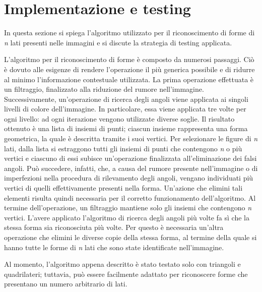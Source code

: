 	\section*{Implementazione e testing}
		In questa sezione si spiega l'algoritmo utilizzato per il riconoscimento di forme di \emph{n} lati presenti nelle immagini e si discute la strategia di testing applicata.
		
		L'algoritmo per il riconoscimento di forme è composto da numerosi passaggi.
		Ciò è dovuto alle esigenze di rendere l'operazione il più generica possibile e di ridurre al minimo l'informazione contestuale utilizzata.
		La prima operazione effettuata è un filtraggio, finalizzato alla riduzione del rumore nell'immagine.
		Successivamente, un'operazione di ricerca degli angoli viene applicata ai singoli livelli di colore dell'immagine.
		In particolare, essa viene applicata tre volte per ogni livello: ad ogni iterazione vengono utilizzate diverse soglie.
		Il risultato ottenuto è una lista di insiemi di punti; ciascun insieme rappresenta una forma geometrica, la quale è descritta tramite i suoi vertici.
		Per selezionare le figure di \emph{n} lati, dalla lista si estraggono tutti gli insiemi di punti che contengono \emph{n} o più vertici e ciascuno di essi subisce un'operazione finalizzata all'eliminazione dei falsi angoli.
		Può succedere, infatti, che, a causa del rumore presente nell'immagine o di imperfezioni nella procedura di rilevamento degli angoli, vengano individuati più vertici di quelli effettivamente presenti nella forma.
		Un'azione che elimini tali elementi risulta quindi necessaria per il corretto funzionamento dell'algoritmo.
		Al termine dell'operazione, un filtraggio mantiene solo gli insiemi che contengono \emph{n} vertici.
		L'avere applicato l'algoritmo di ricerca degli angoli più volte fa sì che la stessa forma sia riconosciuta più volte.	
		Per questo è necessaria un'altra operazione che elimini le diverse copie della stessa forma, al termine della quale si hanno tutte le forme di \emph{n} lati che sono state identificate nell'immagine. 

		Al momento, l'algoritmo appena descritto è stato testato solo con triangoli e quadrilateri; tuttavia, può essere facilmente adattato per riconoscere forme che presentano un numero arbitrario di lati. 
		
